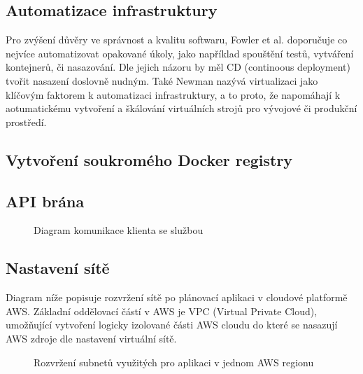 \documentclass[thesis=M,czech]{FITthesis}[2019/12/23]
\theoremstyle{plain}
\theoremstyle{definition}
\begin{document}


\subsection{Automatizace infrastruktury}

Pro zvýšení důvěry ve správnost a kvalitu softwaru, Fowler et al. \cite{microservices-article} doporučuje co nejvíce automatizovat opakované úkoly, jako například spouštění testů, vytváření kontejnerů, či nasazování. Dle jejich názoru by měl CD (continoous deployment) tvořit nasazení doslovně nudným. Také Newman \cite{microservices-book} nazývá virtualizaci jako klíčovým faktorem k automatizaci infrastruktury, a to proto, že napomáhají k aotumatickému vytvoření a škálování virtuálních strojů pro vývojové či produkční prostředí.



\subsection{Vytvoření soukromého Docker registry}




\subsection{API brána}


\begin{figure}[H]\centering
	

	\caption[Diagram komunikace klienta se službou]{Diagram komunikace klienta se službou}\label{fig:float}
\end{figure}



\subsection{Nastavení sítě}

Diagram níže popisuje rozvržení sítě po plánovací aplikaci v cloudové platformě AWS. Základní oddělovací částí v AWS je VPC (Virtual Private Cloud)\cite{aws-vpc}, umožňující vytvoření logicky izolované části AWS cloudu do které se nasazují AWS zdroje dle nastavení virtuální sítě.

\begin{figure}[H]\centering
	

	\caption[Rozvržení subnetů využitých pro aplikaci v jednom AWS regionu]{Rozvržení subnetů využitých pro aplikaci v jednom AWS regionu}\label{fig:float}
\end{figure}
\end{document}
